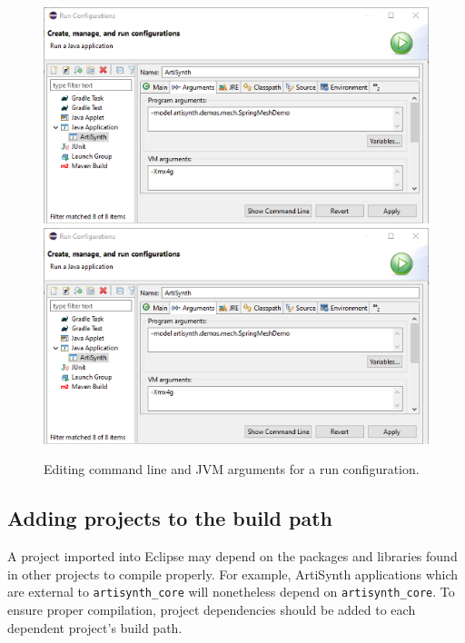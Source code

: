 \begin{figure}
\begin{center}
\iflatexml
  \includegraphics[]{images/EclipseLaunchConfig}
\else
  \includegraphics[width=6in]{images/EclipseLaunchConfig}
\fi
\end{center}
\caption{Editing command line and JVM arguments for a run configuration.}%
\label{EclipseRunArguments:fig}
\end{figure}

\subsection{Adding projects to the build path}
\label{AddingProjectsToBuildPath}

A project imported into Eclipse may depend on the packages and
libraries found in other projects to compile properly.  For example,
ArtiSynth applications which are external to {\tt artisynth\_core}
will nonetheless depend on {\tt artisynth\_core}. To ensure proper
compilation, project dependencies should be added to each dependent
project's build path.

